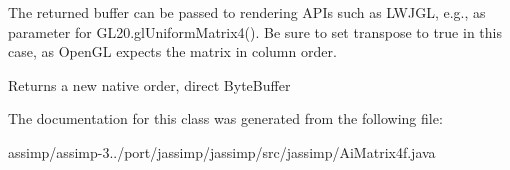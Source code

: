 The returned buffer can be passed to rendering A\+P\+Is such as L\+W\+J\+G\+L, e.\+g., as parameter for {\ttfamily G\+L20.\+gl\+Uniform\+Matrix4()}. Be sure to set {\ttfamily transpose} to {\ttfamily true} in this case, as Open\+G\+L expects the matrix in column order.

\begin{DoxyReturn}{Returns}
a new native order, direct Byte\+Buffer 
\end{DoxyReturn}


The documentation for this class was generated from the following file\+:\begin{DoxyCompactItemize}
\item 
assimp/assimp-\/3../port/jassimp/jassimp/src/jassimp/Ai\+Matrix4f.\+java\end{DoxyCompactItemize}
